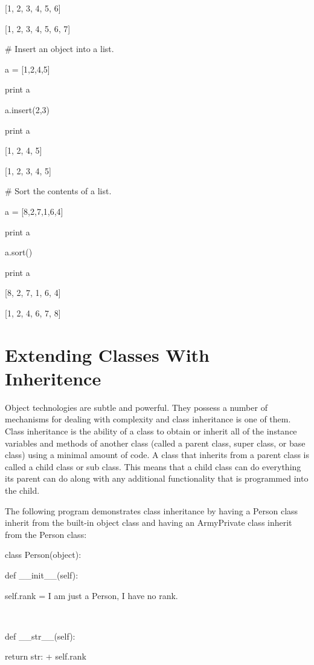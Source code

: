 \documentclass[12pt,oneside]{book}
\begin{document}
{\textbar}

[1, 2, 3, 4, 5, 6]

[1, 2, 3, 4, 5, 6, 7]


\# Insert an object into a list.

a = [1,2,4,5]

print a

a.insert(2,3)

print a

{\textbar}

[1, 2, 4, 5]

[1, 2, 3, 4, 5]

\# Sort the contents of a list.

a = [8,2,7,1,6,4]

print a

a.sort()

print a

{\textbar}

[8, 2, 7, 1, 6, 4]

[1, 2, 4, 6, 7, 8]

\section[Extending Classes With Inheritence]{ Extending Classes With Inheritence}

Object technologies are subtle and powerful. They possess a number of mechanisms for dealing with complexity and class inheritance is one of them. Class inheritance is the ability of a class to obtain or inherit all of the instance variables and methods of another class (called a parent class, super class, or base class) using a minimal amount of code. A class that inherits from a parent class is called a child class or sub class. This means that a child class can do everything its parent can do along with any additional functionality that is programmed into the child.  

The following program demonstrates class inheritance by having a Person class inherit from the built{}-in object class and having an ArmyPrivate class inherit from the Person class: 

class Person(object):

 def \_\_init\_\_(self):

  self.rank = {\textquotedbl}I am just a Person, I have no rank.{\textquotedbl}

\ \ 

 def \_\_str\_\_(self):

  return {\textquotedbl}str: {\textquotedbl} + self.rank
\end{document}
